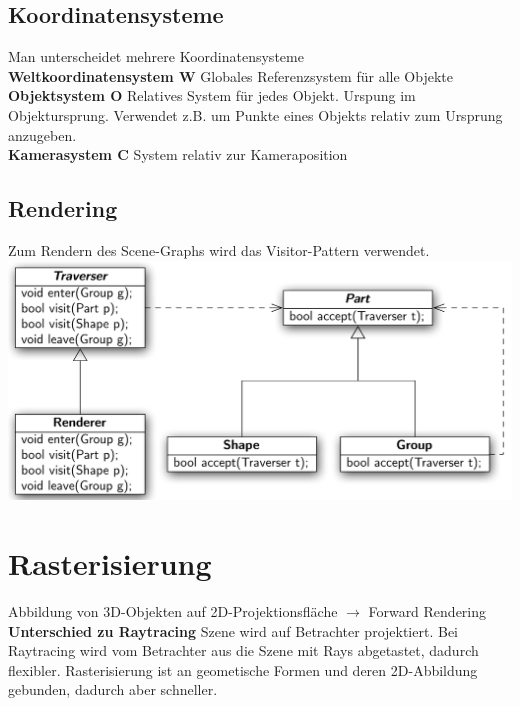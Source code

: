 \documentclass[12pt]{article}
\begin{document}
	\subsection{Koordinatensysteme}
	Man unterscheidet mehrere Koordinatensysteme\\
	\textbf{Weltkoordinatensystem $\mathbf{W}$} Globales Referenzsystem für alle Objekte\\
	\textbf{Objektsystem $\mathbf{O}$} Relatives System für jedes Objekt. Urspung im Objektursprung. Verwendet z.B. um Punkte eines Objekts relativ zum Ursprung anzugeben.\\
	\textbf{Kamerasystem $\mathbf{C}$} System relativ zur Kameraposition

	\subsection{Rendering}
	Zum Rendern des Scene-Graphs wird das Visitor-Pattern verwendet.\\
	\includegraphics[width=\linewidth]{figures/visitor-pattern.png}

	\section{Rasterisierung}
	Abbildung von 3D-Objekten auf 2D-Projektionsfläche $\rightarrow$ Forward Rendering\\
	\textbf{Unterschied zu Raytracing} Szene wird auf Betrachter projektiert. Bei Raytracing wird vom Betrachter aus die Szene mit Rays abgetastet, dadurch flexibler. Rasterisierung ist an geometische Formen und deren 2D-Abbildung gebunden, dadurch aber schneller.
	
\end{document}
